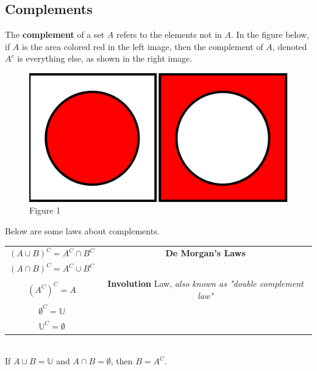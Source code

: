     \pagebreak
    \subsection{Complements}
        The \textbf{complement} of a set $A$ refers to the elements not in $A$. In the figure
        below, if $A$ is the area colored red in the left image, then the complement of $A$,
        denoted $A^c$ is everything else, as shown in the right image.

        \begin{figure}[hbt!]
            \centering
            \includegraphics[scale=0.4]{Resources/Unit1SetTheory/complement1.PNG}
            \caption*{Figure 1}
        \end{figure}

        \noindent Below are some laws about complements.

        \begin{center}
            \begin{tabular}{|c|c|}
                \hline
                $(A\cup B)^C = A^C \cap B^C$ & \textbf{De Morgan's Laws} \\
                $(A\cap B)^C = A^C \cup B^C$ & \\ \hline
                $(A^C)^C=A$ & \textbf{Involution} Law, \textit{also known as "double complement law"} \\ \hline
                $\emptyset^C=\mathbb{U}$ & \\ \hline
                $\mathbb{U}^C=\emptyset$ & \\ \hline
            \end{tabular}
        \end{center}\\

        \noindent If $A\cup B=\mathbb{U}$ and $A\cap B=\emptyset$, then $B=A^C$.




